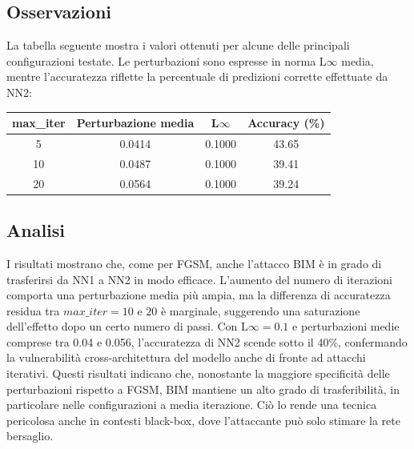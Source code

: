         \subsection{Osservazioni}
            La tabella seguente mostra i valori ottenuti per alcune delle principali configurazioni testate. Le perturbazioni sono espresse in norma L$\infty$ media, mentre l’accuratezza riflette la percentuale di predizioni corrette effettuate da NN2:
                \begin{center}
                    \begin{tabular}{cccc}
                        \toprule
                        \textbf{max\_iter} & \textbf{Perturbazione media} & \textbf{L$\infty$} & \textbf{Accuracy (\%)} \\
                        \midrule
                        5  & 0.0414 & 0.1000 & 43.65 \\
                        10 & 0.0487 & 0.1000 & 39.41 \\
                        20 & 0.0564 & 0.1000 & 39.24 \\
                        \bottomrule
                    \end{tabular}
                \end{center}

        \subsection{Analisi}
            I risultati mostrano che, come per FGSM, anche l’attacco BIM è in grado di trasferirsi da NN1 a NN2 in modo efficace. L’aumento del numero di iterazioni comporta una perturbazione media più ampia, ma la differenza di accuratezza residua tra $max\_iter = 10$ e $20$ è marginale, suggerendo una saturazione dell'effetto dopo un certo numero di passi.
            Con L$\infty = 0.1$ e perturbazioni medie comprese tra 0.04 e 0.056, l’accuratezza di NN2 scende sotto il 40\%, confermando la vulnerabilità cross-architettura del modello anche di fronte ad attacchi iterativi.
            Questi risultati indicano che, nonostante la maggiore specificità delle perturbazioni rispetto a FGSM, BIM mantiene un alto grado di trasferibilità, in particolare nelle configurazioni a media iterazione. Ciò lo rende una tecnica pericolosa anche in contesti black-box, dove l'attaccante può solo stimare la rete bersaglio.

